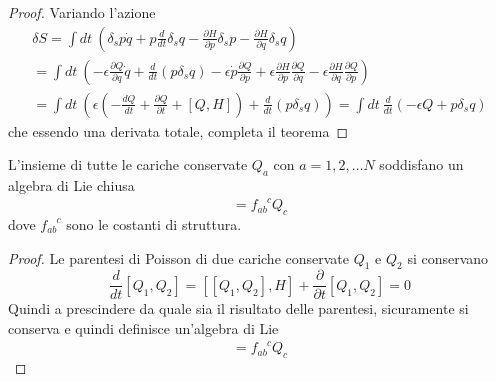 \begin{proof}
    Variando l'azione
\begin{equation}
\begin{gathered}
    \delta S = \int dt ~  (\delta_s p \dot q + p \frac{d}{dt} \delta_s q - \frac{\partial H}{\partial p} \delta_s p - \frac{\partial H}{\partial q} \delta_s q) \\ = \int dt ~ (- \epsilon \frac{\partial Q}{\partial q} \dot q + \frac{d}{dt} (p \delta_s q) - \epsilon \dot p \frac{\partial Q}{\partial p} + \epsilon \frac{\partial H}{\partial p} \frac{\partial Q}{\partial q} - \epsilon \frac{\partial H}{\partial q}\frac{\partial Q}{\partial p}) \\ = \int dt ~ (\epsilon (- \frac{dQ}{dt} + \frac{\partial Q}{\partial t} + [Q, H] ) + \frac{d}{dt} (p \delta_s q)) = \int dt ~ \frac{d}{dt}(-\epsilon Q + p \delta_s q)
\end{gathered}
\end{equation}
    che essendo una derivata totale, completa il teorema
\end{proof}

\begin{theorem}
    L'insieme di tutte le cariche conservate $Q_a$ con $a = 1, 2, \ldots N$ soddisfano un algebra di Lie chiusa
\begin{equation}
[Q_a, Q_b] = f_{ab}^{\phantom{ab}c} Q_c
\end{equation}
    dove $f_{ab}^{\phantom{ab}c}$ sono le costanti di struttura.
\end{theorem}

\begin{proof}
    Le parentesi di Poisson di due cariche conservate $Q_1$ e $Q_2$ si conservano
\begin{equation}
\frac{d}{dt} [Q_1, Q_2] = [[Q_1, Q_2], H] + \frac{\partial}{\partial t} [Q_1, Q_2] = 0
\end{equation} 
Quindi a prescindere da quale sia il risultato delle parentesi, sicuramente si conserva e quindi definisce un'algebra di Lie
\begin{equation}
[Q_a, Q_b] = f_{ab}^{\phantom{ab}c} Q_c
\end{equation}
\end{proof}

